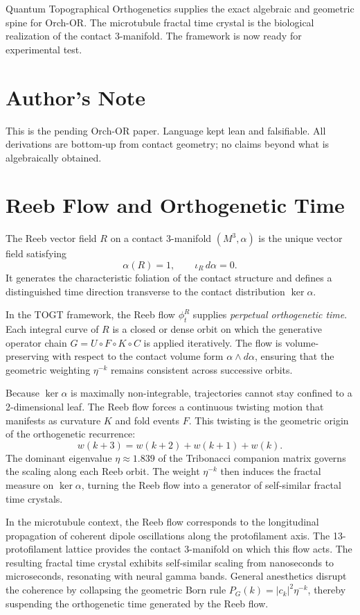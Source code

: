 \documentclass[11pt,a4paper]{article}
\theoremstyle{definition}
\theoremstyle{remark}
\begin{document}
Quantum Topographical Orthogenetics supplies the exact algebraic and geometric spine for
Orch-OR. The microtubule fractal time crystal is the biological realization of the contact
3-manifold. The framework is now ready for experimental test.

\section*{Author's Note}

This is the pending Orch-OR paper. Language kept lean and falsifiable. All derivations
are bottom-up from contact geometry; no claims beyond what is algebraically obtained.

\section{Reeb Flow and Orthogenetic Time}

The Reeb vector field $R$ on a contact 3-manifold $(M^3,\alpha)$ is the unique vector field
satisfying
\[
  \alpha(R)=1,\qquad \iota_R\,d\alpha=0.
\]
It generates the characteristic foliation of the contact structure and defines a distinguished
time direction transverse to the contact distribution $\ker\alpha$.

In the TOGT framework, the Reeb flow $\phi_t^R$ supplies \emph{perpetual orthogenetic time}.
Each integral curve of $R$ is a closed or dense orbit on which the generative operator chain
$G=U\circ F\circ K\circ C$ is applied iteratively. The flow is volume-preserving with respect
to the contact volume form $\alpha\wedge d\alpha$, ensuring that the geometric weighting
$\eta^{-k}$ remains consistent across successive orbits.

Because $\ker\alpha$ is maximally non-integrable, trajectories cannot stay confined to a
2-dimensional leaf. The Reeb flow forces a continuous twisting motion that manifests as
curvature $K$ and fold events $F$. This twisting is the geometric origin of the orthogenetic
recurrence:
\[
  w(k+3)=w(k+2)+w(k+1)+w(k).
\]
The dominant eigenvalue $\eta\approx1.839$ of the Tribonacci companion matrix governs the
scaling along each Reeb orbit. The weight $\eta^{-k}$ then induces the fractal measure on
$\ker\alpha$, turning the Reeb flow into a generator of self-similar fractal time crystals.

In the microtubule context, the Reeb flow corresponds to the longitudinal propagation of
coherent dipole oscillations along the protofilament axis. The 13-protofilament lattice
provides the contact 3-manifold on which this flow acts. The resulting fractal time crystal
exhibits self-similar scaling from nanoseconds to microseconds, resonating with neural gamma
bands. General anesthetics disrupt the coherence by collapsing the geometric Born rule
$P_G(k)=|c_k|^2\eta^{-k}$, thereby suspending the orthogenetic time generated by the Reeb flow.
\end{document}
